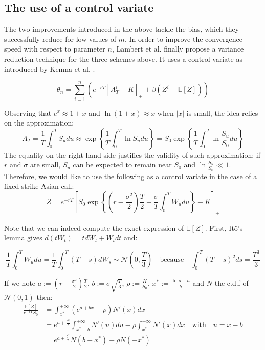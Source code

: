 \documentclass{article}
\begin{document}
\subsection{The use of a control variate}

The two improvements introduced in the above tackle the bias, which they successfully reduce for low values of $m$.
In order to improve the convergence speed with respect to parameter $n$,
Lambert et al. \cite{main} finally propose a variance reduction technique
for the three schemes above. It uses a control variate as introduced by Kemna et al. \cite{Vorst}.

\begin{equation}
	\theta_n = \sum_{i=1}^n \left( e^{-rT} \left[ A_T^i - K \right]_+ + \beta \left( Z^i - \mathbb E [Z] \right) \right)
	\tag{$\ast$}
\end{equation}

Observing that $e^x \approx 1 + x$ and $\ln(1 + x) \approx x$ when $| x |$ is small,
the idea relies on the approximation:
\[
	A_T = \frac{1}{T} \int_0^T S_u du \approx \exp \left\{ \frac{1}{T} \int_0^T \ln S_u du \right\}
	= S_0 \exp \left\{ \frac{1}{T} \int_0^T \ln \frac{S_u}{S_0} du \right\}
\]
The equality on the right-hand side justifies the validity of such approximation: if $r$ and $\sigma$ are small,
$S_u$ can be expected to remain near $S_0$ and $\ln \frac{S_u}{S_0} \ll 1$.
Therefore, we would like to use the following as a control variate in the case of a fixed-strike Asian call:
\[
	Z
	= e^{-rT} \left[ S_0 \exp \left\{ \left( r - \frac{\sigma^2}{2} \right) \frac{T}{2} +
		\frac{\sigma}{T} \int_0^T W_u du \right\}
		- K \right]_+
\]

Note that we can indeed compute the exact expression of $\mathbb E[Z]$. First, It\^o's lemma
gives $d(tW_t) = tdW_t + W_tdt$ and:

\[
	\frac{1}{T} \int_0^T W_u du = \frac{1}{T} \int_0^T (T-s) dW_s \sim \mathcal N \left(0, \frac{T}{3} \right)
	\quad \text{because} \quad \int_0^T (T-s)^2 ds = \frac{T^3}{3}
\]

If we note $a := \left( r - \frac{\sigma^2}{2} \right) \frac{T}{2}$, $b := \sigma \sqrt{\frac{T}{3}}$, $\rho :=\frac{K}{S_0}$,
$x^\ast := \frac{\ln \rho - a}{b}$ and $N$ the c.d.f of $\mathcal N (0, 1)$ then:
\begin{align*}
	\frac{\mathbb E[Z]}{e^{-rT} S_0}
	&= \int_{x^\ast}^{+ \infty} \left( e^{a + bx} - \rho \right) N'(x) dx \\
	&= e^{a + \frac{b^2}{2}} \int_{x^\ast - b}^{+ \infty} N'(u) du - \rho \int_{x^\ast}^{+ \infty} N'(x) dx
	\quad \text{with} \quad u = x - b \\
	&= e^{a + \frac{b^2}{2}} N(b - x^\ast) - \rho N(-x^\ast)
\end{align*}
	
\end{document}
